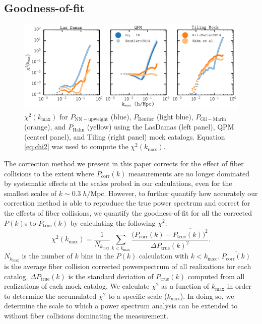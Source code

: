 \documentclass{emulateapj}
\begin{document}
\subsection{Goodness-of-fit} \label{sec:litcomp}
\begin{figure} 
\begin{center}
\includegraphics[scale=0.55]{fcpaper_pk_chisquared_comparison.png} 
\caption{$\chi^2 (k_\mathrm{max})$ for $P_\mathrm{NN-upweight}$ (blue), $P_\mathrm{Beutler}$ (light blue), $P_\mathrm{Gil-Marin}$ (orange), and $P_\mathrm{Hahn}$ (yellow) using the LasDamas (left panel), QPM (centerl panel), and Tiling (right panel) mock catalogs. Equation \ref{eq:chi2} was used to compute the $\chi^2(k_\mathrm{max})$. }\label{fig:peaksnchi2}
\end{center}
\end{figure}

The correction method we present in this paper corrects for the effect of fiber collisions to the extent where $P_\mathrm{corr}(k)$ measurements are no longer dominated by systematic effects at the scales probed in our calculations, even for the smallest scales of $k \sim 0.3 \; h/\mathrm{Mpc}$. However, to further quantify how accurately our correction method is able to reproduce the true power spectrum and correct for the effects of fiber collisions, we quantify the goodness-of-fit for all the corrected $P(k)$s to $P_\mathrm{true}(k)$ by calculating the following $\chi^2$: 
\begin{equation}
\chi^2 (k_\mathrm{max}) = \frac{1}{N_{k_\mathrm{max}}} \sum\limits_{k< k_\mathrm{max}} \frac{(\overline{P_\mathrm{corr}(k)} - \overline{P_\mathrm{true}(k))^2}}{\Delta P_\mathrm{true} (k)^2}. \label{eq:chi2}
\end{equation}
$N_{k_\mathrm{max}}$ is the number of $k$ bins in the $P(k)$ calculation with $k < k_\mathrm{max}$. $\overline{P_\mathrm{corr}(k)}$ is the average fiber collision corrected powerspectrum of all realizations for each catalog. $\Delta P_\mathrm{true}(k)$ is the standard deviation of $P_\mathrm{true}(k)$ computed from all realizations of each mock catalog. We calculate $\chi^2$ as a function of $k_\mathrm{max}$ in order to determine the accumulated $\chi^2$ to a specific scale ($k_\mathrm{max}$). In doing so, we determine the scale to which a power spectrum analysis can be extended to without fiber collisions dominating the measurement. 
\end{document}
